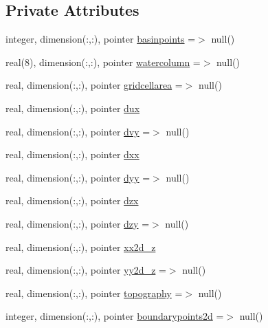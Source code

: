 \subsection*{Private Attributes}
\begin{DoxyCompactItemize}
\item 
integer, dimension(\+:,\+:), pointer \mbox{\hyperlink{structmodulerunoff_1_1t__extvar_a05c43e178abf2be77a412ef9c8295ebd}{basinpoints}} =$>$ null()
\item 
real(8), dimension(\+:,\+:), pointer \mbox{\hyperlink{structmodulerunoff_1_1t__extvar_a19fd76c8971ac33f249a9722eb775168}{watercolumn}} =$>$ null()
\item 
real, dimension(\+:,\+:), pointer \mbox{\hyperlink{structmodulerunoff_1_1t__extvar_a6a5b9508df6926a4ccc5332738343022}{gridcellarea}} =$>$ null()
\item 
real, dimension(\+:,\+:), pointer \mbox{\hyperlink{structmodulerunoff_1_1t__extvar_aa37bfe5190fa69d2c1285ce154698672}{dux}}
\item 
real, dimension(\+:,\+:), pointer \mbox{\hyperlink{structmodulerunoff_1_1t__extvar_a5a945ae4ef565dbf4e2975d60e730f99}{dvy}} =$>$ null()
\item 
real, dimension(\+:,\+:), pointer \mbox{\hyperlink{structmodulerunoff_1_1t__extvar_a5a21b2ed8db5f57e80003accfeaeb484}{dxx}}
\item 
real, dimension(\+:,\+:), pointer \mbox{\hyperlink{structmodulerunoff_1_1t__extvar_a306ea4045a3292991ba73815bdcf7c0d}{dyy}} =$>$ null()
\item 
real, dimension(\+:,\+:), pointer \mbox{\hyperlink{structmodulerunoff_1_1t__extvar_a4dbfe5d9e1e29c47919a4dc4c290211e}{dzx}}
\item 
real, dimension(\+:,\+:), pointer \mbox{\hyperlink{structmodulerunoff_1_1t__extvar_ac309b9947bf06c819a3f31ddc4171ba4}{dzy}} =$>$ null()
\item 
real, dimension(\+:,\+:), pointer \mbox{\hyperlink{structmodulerunoff_1_1t__extvar_a863d4c27cbe79e980b8d9dee06a97306}{xx2d\+\_\+z}}
\item 
real, dimension(\+:,\+:), pointer \mbox{\hyperlink{structmodulerunoff_1_1t__extvar_a2db65be81d98978aada4875a8b669a07}{yy2d\+\_\+z}} =$>$ null()
\item 
real, dimension(\+:,\+:), pointer \mbox{\hyperlink{structmodulerunoff_1_1t__extvar_aa4b4ead20cf9face5eb2e43756b8cb9d}{topography}} =$>$ null()
\item 
integer, dimension(\+:,\+:), pointer \mbox{\hyperlink{structmodulerunoff_1_1t__extvar_a130bc580d6ff8b8666fae6250533ce62}{boundarypoints2d}} =$>$ null()

\end{DoxyCompactItemize}
